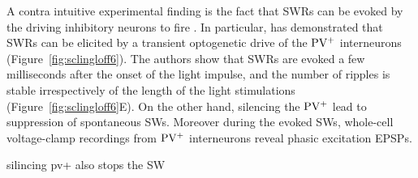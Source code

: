     A contra intuitive experimental finding is the fact that SWRs can be evoked
    by the driving inhibitory neurons to fire \citep{Ellender2010,
    Schlingloff2014}. In particular, \cite{Schlingloff2014} has demonstrated
    that SWRs can be elicited by a transient optogenetic drive of the $\rm
    PV^+$ interneurons (Figure~\ref{fig:sclingloff6}). The authors show that
    SWRs are evoked a few milliseconds after the onset of the light impulse,
    and the number of ripples is stable irrespectively of the length of the
    light stimulations (Figure~\ref{fig:sclingloff6}E). On the other hand,
    silencing the $\rm PV^+$ lead to suppression of spontaneous SWs. Moreover
    during the evoked SWs, whole-cell voltage-clamp recordings from $\rm PV^+$
    interneurons reveal phasic excitation EPSPs.

    silincing pv+ also stops the SW

